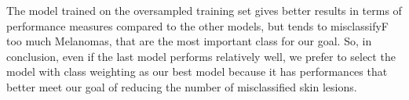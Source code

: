 		The model trained on the oversampled training set gives better results in terms of performance measures compared to the other models, but tends to misclassifyF too much Melanomas, that are the most important class for our goal.
		So, in conclusion, even if the last model performs relatively well, we prefer to select the model with class weighting as our best model because it has performances that better meet our goal of reducing the number of misclassified skin lesions.
		
		
		
		
		